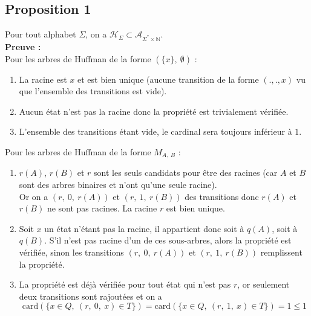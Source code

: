 \documentclass[a4paper, 12pt]{article}
\let\qed\square
\begin{document}
\subsection{Proposition 1}
Pour tout alphabet $\Sigma$, on a $\mathcal{H}_\Sigma \subset \mathcal{A}_{\Sigma^*\times \mathbb{N}}$. \\
\textbf{Preuve :} \\
Pour les arbres de Huffman de la forme $(\{x\},\ \emptyset)$ :
\begin{enumerate}
\item La racine est $x$ et est bien unique (aucune transition de la forme $(., ., x)$ vu que l'ensemble des transitions est vide).
\item Aucun état n'est pas la racine donc la propriété est trivialement vérifiée.
\item L'ensemble des transitions étant vide, le cardinal sera toujours inférieur à $1$.
\end{enumerate}
Pour les arbres de Huffman de la forme $M_{A,\ B}$ :
\begin{enumerate}
\item $r(A)$, $r(B)$ et $r$ sont les seuls candidats pour être des racines (car $A$ et $B$ sont des arbres binaires et n'ont qu'une seule racine). \\
Or on a $(r,\ 0,\ r(A))$ et $(r,\ 1,\ r(B))$ des transitions donc $r(A)$ et $r(B)$ ne sont pas racines. La racine $r$ est bien unique.
\item Soit $x$ un état n'étant pas la racine, il appartient donc soit à $q(A)$, soit à $q(B)$. S'il n'est pas racine d'un de ces sous-arbres, alors la propriété est vérifiée, sinon les transitions $(r,\ 0,\ r(A))$ et $(r,\ 1,\ r(B))$ remplissent la propriété.
\item La propriété est déjà vérifiée pour tout état qui n'est pas $r$, or seulement deux transitions sont rajoutées et on a
$$
\text{card}(\{x \in Q,\ (r,\ 0,\ x) \in T\}) = \text{card}(\{x \in Q,\ (r,\ 1,\ x) \in T\}) = 1 \leq 1
$$
\end{enumerate}
\qed
\end{document}
